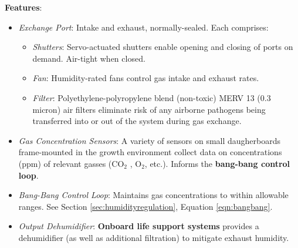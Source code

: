 \textbf{Features}:
\begin{itemize}
    \item \textit{Exchange Port}: Intake and exhaust, normally-sealed. Each comprises:
    \begin{itemize}
        \item \textit{Shutters}: Servo-actuated shutters enable opening and closing of ports on demand. Air-tight when closed.
        \item \textit{Fan}: Humidity-rated fans control gas intake and exhaust rates.
        \item \textit{Filter}: Polyethylene-polyropylene blend (non-toxic) MERV 13 (0.3 micron) air filters \cite{filter} eliminate risk of any airborne pathogens being transferred into or out of the system during gas exchange.
    \end{itemize}
    \item \textit{Gas Concentration Sensors}: A variety of sensors on small daugherboards frame-mounted in the growth environment collect data on concentrations (ppm) of relevant gasses (CO${}_2$ \cite{co2sensor}, O${}_2$, etc.). Informs the \textbf{bang-bang control loop}.
    \item \textit{Bang-Bang Control Loop}: Maintains gas concentrations to within allowable ranges. See Section \ref{sec:humidityregulation}, Equation \ref{eqn:bangbang}.
    \item \textit{Output Dehumidifier}: \textbf{Onboard life support systems} provides a dehumidifier (as well as additional filtration) to mitigate exhaust humidity.
\end{itemize}